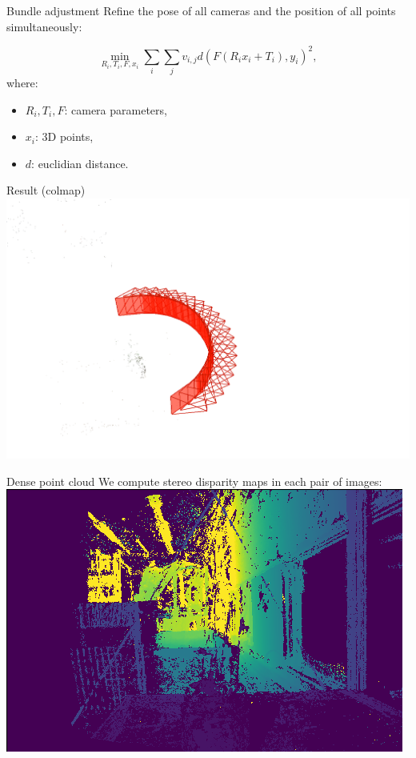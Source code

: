 \documentclass{beamer}
\begin{document}
\begin{frame}{Bundle adjustment}
    Refine the pose of all cameras and the position of all points simultaneously:

    \[
        \min_{R_i, T_i, F, x_i} \sum_i \sum_j v_{i,j} d(F(R_i x_i + T_i), y_i)^2,
    \]
    where:
    \begin{itemize}
        \item $R_i, T_i, F$: camera parameters,
        \item $x_i$: 3D points,
        \item $d$: euclidian distance.
    \end{itemize}
\end{frame}
\begin{frame}{Result (colmap)}
    \includegraphics[width=\textwidth]{images/poses.png}
\end{frame}
\begin{frame}{Dense point cloud}
    We compute stereo disparity maps in each pair of images:
    \includegraphics[width=\textwidth]{images/depthmap.png}
\end{frame}
\end{document}
